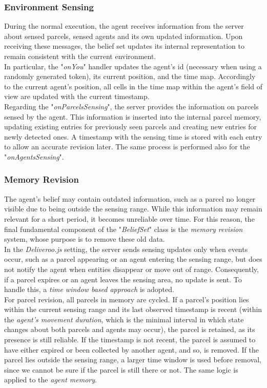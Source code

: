         \subsubsection{Environment Sensing}
            During the normal execution, the agent receives information from the server about sensed parcels, sensed agents and its own updated information. Upon receiving these messages, the belief set updates its internal representation to remain consistent with the current environment.
            \medskip\\
            In particular, the "\textit{onYou}" handler updates the agent's id (necessary when using a randomly generated token), its current position, and the time map. Accordingly to the current agent's position, all cells in the time map within the agent's field of view are updated with the current timestamp.
            \medskip\\
            Regarding the "\textit{onParcelsSensing}", the server provides the information on parcels sensed by the agent. This information is inserted into the internal parcel memory, updating existing entries for previously seen parcels and creating new entries for newly detected ones. A timestamp with the sensing time is stored with each entry to allow an accurate revision later. The same process is performed also for the "\textit{onAgentsSensing}".

        \subsubsection{Memory Revision}\label{memoryRevision}
            The agent's belief may contain outdated information, such as a parcel no longer visible due to being outside the sensing range. While this information may remain relevant for a short period, it becomes unreliable over time. For this reason, the final fundamental component of the "\textit{BeliefSet}" class is the \textit{memory revision} system, whose purpose is to remove these old data.
            \medskip\\
            In the \textit{Deliveroo.js} setting, the server sends sensing updates only when events occur, such as a parcel appearing or an agent entering the sensing range, but does not notify the agent when entities disappear or move out of range. Consequently, if a parcel expires or an agent leaves the sensing area, no update is sent. To handle this, a \textit{time window based approach} is adopted.
            \medskip\\
            For parcel revision, all parcels in memory are cycled. If a parcel's position lies within the current sensing range and its last observed timestamp is recent (within the \textit{agent's movement duration}, which is the minimal interval in which state changes about both parcels and agents may occur), the parcel is retained, as its presence is still reliable. If the timestamp is not recent, the parcel is assumed to have either expired or been collected by another agent, and so, is removed. If the parcel lies outside the sensing range, a larger time window is used before removal, since we cannot be sure if the parcel is still there or not. The same logic is applied to the \textit{agent memory}.

